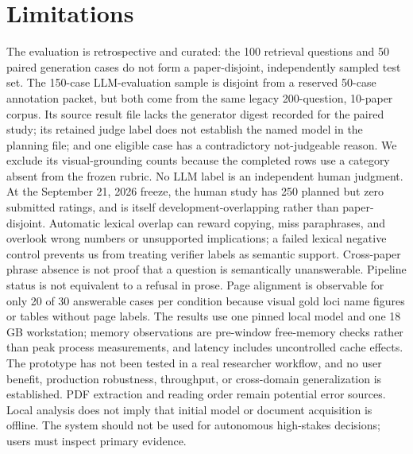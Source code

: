 \section*{Limitations}
The evaluation is retrospective and curated: the 100 retrieval questions and 50 paired generation cases do not form a paper-disjoint, independently sampled test set. The 150-case LLM-evaluation sample is disjoint from a reserved 50-case annotation packet, but both come from the same legacy 200-question, 10-paper corpus. Its source result file lacks the generator digest recorded for the paired study; its retained judge label does not establish the named model in the planning file; and one eligible case has a contradictory not-judgeable reason. We exclude its visual-grounding counts because the completed rows use a category absent from the frozen rubric. No LLM label is an independent human judgment. At the September 21, 2026 freeze, the human study has 250 planned but zero submitted ratings, and is itself development-overlapping rather than paper-disjoint. Automatic lexical overlap can reward copying, miss paraphrases, and overlook wrong numbers or unsupported implications; a failed lexical negative control prevents us from treating verifier labels as semantic support. Cross-paper phrase absence is not proof that a question is semantically unanswerable. Pipeline status is not equivalent to a refusal in prose. Page alignment is observable for only 20 of 30 answerable cases per condition because visual gold loci name figures or tables without page labels. The results use one pinned local model and one 18\,GB workstation; memory observations are pre-window free-memory checks rather than peak process measurements, and latency includes uncontrolled cache effects. The prototype has not been tested in a real researcher workflow, and no user benefit, production robustness, throughput, or cross-domain generalization is established. PDF extraction and reading order remain potential error sources. Local analysis does not imply that initial model or document acquisition is offline. The system should not be used for autonomous high-stakes decisions; users must inspect primary evidence.
